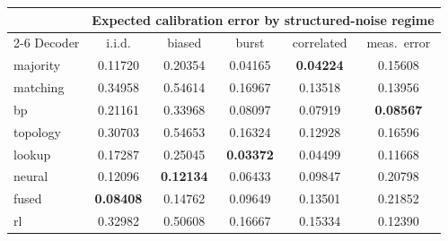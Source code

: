 \begin{tabular}{lccccc}
\toprule
 & \multicolumn{5}{c}{Expected calibration error by structured-noise regime} \\
\cmidrule(lr){2-6}
Decoder & i.i.d. & biased & burst & correlated & meas.\ error \\
\midrule
majority  & 0.11720 & 0.20354 & 0.04165 & \textbf{0.04224} & 0.15608 \\
matching  & 0.34958 & 0.54614 & 0.16967 & 0.13518 & 0.13956 \\
bp        & 0.21161 & 0.33968 & 0.08097 & 0.07919 & \textbf{0.08567} \\
topology  & 0.30703 & 0.54653 & 0.16324 & 0.12928 & 0.16596 \\
lookup    & 0.17287 & 0.25045 & \textbf{0.03372} & 0.04499 & 0.11668 \\
neural    & 0.12096 & \textbf{0.12134} & 0.06433 & 0.09847 & 0.20798 \\
fused     & \textbf{0.08408} & 0.14762 & 0.09649 & 0.13501 & 0.21852 \\
rl        & 0.32982 & 0.50608 & 0.16667 & 0.15334 & 0.12390 \\
\bottomrule
\end{tabular}
